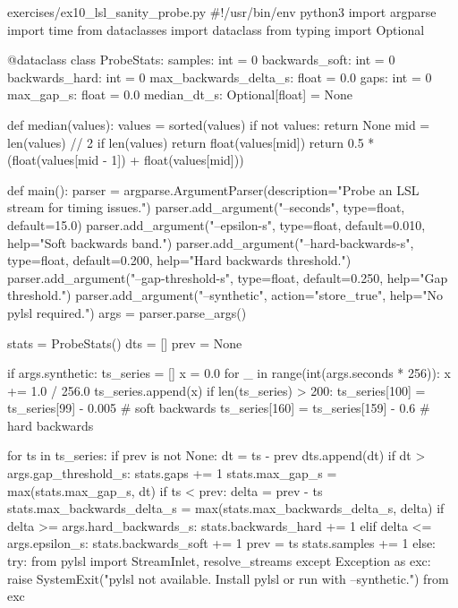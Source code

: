 \documentclass[11pt,openany]{book}
\begin{document}
\begin{filecontents*}{exercises/ex10_lsl_sanity_probe.py}
#!/usr/bin/env python3
import argparse
import time
from dataclasses import dataclass
from typing import Optional


@dataclass
class ProbeStats:
    samples: int = 0
    backwards_soft: int = 0
    backwards_hard: int = 0
    max_backwards_delta_s: float = 0.0
    gaps: int = 0
    max_gap_s: float = 0.0
    median_dt_s: Optional[float] = None


def median(values):
    values = sorted(values)
    if not values:
        return None
    mid = len(values) // 2
    if len(values) %
        return float(values[mid])
    return 0.5 * (float(values[mid - 1]) + float(values[mid]))


def main():
    parser = argparse.ArgumentParser(description="Probe an LSL stream for timing issues.")
    parser.add_argument("--seconds", type=float, default=15.0)
    parser.add_argument("--epsilon-s", type=float, default=0.010, help="Soft backwards band.")
    parser.add_argument("--hard-backwards-s", type=float, default=0.200, help="Hard backwards threshold.")
    parser.add_argument("--gap-threshold-s", type=float, default=0.250, help="Gap threshold.")
    parser.add_argument("--synthetic", action="store_true", help="No pylsl required.")
    args = parser.parse_args()

    stats = ProbeStats()
    dts = []
    prev = None

    if args.synthetic:
        ts_series = []
        x = 0.0
        for _ in range(int(args.seconds * 256)):
            x += 1.0 / 256.0
            ts_series.append(x)
        if len(ts_series) > 200:
            ts_series[100] = ts_series[99] - 0.005  # soft backwards
            ts_series[160] = ts_series[159] - 0.6  # hard backwards

        for ts in ts_series:
            if prev is not None:
                dt = ts - prev
                dts.append(dt)
                if dt > args.gap_threshold_s:
                    stats.gaps += 1
                    stats.max_gap_s = max(stats.max_gap_s, dt)
                if ts < prev:
                    delta = prev - ts
                    stats.max_backwards_delta_s = max(stats.max_backwards_delta_s, delta)
                    if delta >= args.hard_backwards_s:
                        stats.backwards_hard += 1
                    elif delta <= args.epsilon_s:
                        stats.backwards_soft += 1
            prev = ts
            stats.samples += 1
    else:
        try:
            from pylsl import StreamInlet, resolve_streams
        except Exception as exc:
            raise SystemExit("pylsl not available. Install pylsl or run with --synthetic.") from exc


\end{filecontents*}
\end{document}
